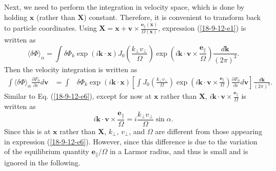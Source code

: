 \documentclass{llncs}
\begin{document}
Next, we need to perform the integration in velocity space, which is done by
holding $\mathbf{x}$ (rather than $\mathbf{X}$) constant. Therefore, it is
convenient to transform back to particle coordinates. Using
$\mathbf{X}=\mathbf{x}+\mathbf{v} \times \frac{\mathbf{e}_{\parallel}
(\mathbf{x})}{\Omega (\mathbf{x})}$, expression (\ref{18-9-12-e1}) is written
as
\begin{equation}
  \langle \delta \Phi \rangle_{\alpha} = \int \delta \Phi_k \exp (i\mathbf{k}
  \cdot \mathbf{x}) J_0 \left( \frac{k_{\perp} v_{\perp}}{\Omega} \right) \exp
  \left( i\mathbf{k} \cdot \mathbf{v} \times
  \frac{\mathbf{e}_{\parallel}}{\Omega} \right) \frac{d\mathbf{k}}{(2 \pi)^3}
  .
\end{equation}
Then the velocity integration is written as
\begin{eqnarray}
  \int \langle \delta \Phi \rangle_{\alpha} \frac{\partial F_0}{\partial
  \varepsilon} d\mathbf{v} & = \int & \delta \Phi_k \exp (i\mathbf{k} \cdot
  \mathbf{x}) \left[ \int J_0 \left( \frac{k_{\perp} v_{\perp}}{\Omega}
  \right) \exp \left( i\mathbf{k} \cdot \mathbf{v} \times
  \frac{\mathbf{e}_{\parallel}}{\Omega} \right) \frac{\partial F_0}{\partial
  \varepsilon} d\mathbf{v} \right] \frac{d\mathbf{k}}{(2 \pi)^3} . 
  \label{18-9-12-e5}
\end{eqnarray}
Similar to Eq. (\ref{18-9-12-e6}), except for now at $\mathbf{x}$ rather than
$\mathbf{X}$, $i\mathbf{k} \cdot \mathbf{v} \times
\frac{\mathbf{e}_{\parallel}}{\Omega}$ is written as
\begin{equation}
  \label{18-9-13-p4} i\mathbf{k} \cdot \mathbf{v} \times
  \frac{\mathbf{e}_{\parallel}}{\Omega} = i \frac{k_{\perp} v_{\perp}}{\Omega}
  \sin \alpha .
\end{equation}
Since this is at $\mathbf{x}$ rather than $\mathbf{X}$, $k_{\perp}$,
$v_{\perp}$, and $\Omega$ are different from those appearing in expression
(\ref{18-9-12-e6}). However, since this difference is due to the variation of
the equilibrium quantity $\mathbf{e}_{\parallel} / \Omega$ in a Larmor radius,
and thus is small and is ignored in the following.
\end{document}
